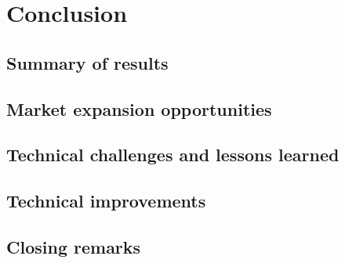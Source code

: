 \chapter{Conclusion}

\section{Summary of results}

\section{Market expansion opportunities}

\section{Technical challenges and lessons learned}

\section{Technical improvements}

\section{Closing remarks}
